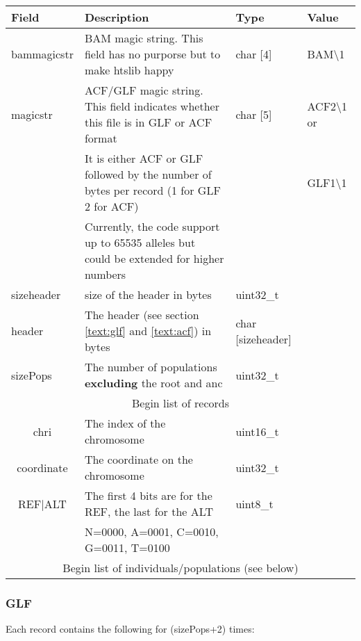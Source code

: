 \documentclass[a4paper]{article}
\begin{document}
\begin{tabular}{|l|p{7cm}|l|l|}
\hline
{\bf Field} & {\bf Description} & {\bf Type} & {\bf Value} \\
\hline
bammagicstr & BAM magic string. This field has no purporse but to make htslib happy & char [4] & BAM\textbackslash1 \\
\hline
magicstr & ACF/GLF magic string. This field indicates whether this file is in GLF or ACF format & char [5] & ACF2\textbackslash1 or \\
         &  It is either ACF or GLF followed by the number of bytes per record (1 for GLF 2 for ACF)   &          & GLF1\textbackslash1 \\
         &  Currently, the code support up to 65535 alleles but could be extended for higher numbers   &          &  \\
\hline
sizeheader & size of the header in bytes   & uint32\_t         & \\
\hline
header     & The header (see section \ref{text:glf} and \ref{text:acf}) in bytes           & char [sizeheader] & \\
\hline
sizePops   & The number of populations {\bf excluding}  the root and anc & uint32\_t         & \\
\hline
\multicolumn{4}{|c|}{Begin list of records} \\
\hline
\multicolumn{1}{|c|}{chri}   & The index of the chromosome & uint16\_t         & \\
\hline
\multicolumn{1}{|c|}{coordinate}   & The coordinate on the chromosome & uint32\_t         & \\
\hline
\multicolumn{1}{|c|}{REF$\vert$ALT}     & The first 4 bits are for the REF, the last for the ALT & uint8\_t         & \\
                                & N=0000, A=0001, C=0010, G=0011, T=0100                  &          & \\
\hline
\multicolumn{4}{|c|}{Begin list of individuals/populations (see below)} \\
\hline
\end{tabular}

\afterpage{\clearpage}


\subsubsection{GLF}

\noindent Each record contains the following for (sizePops+2) times:
\end{document}

